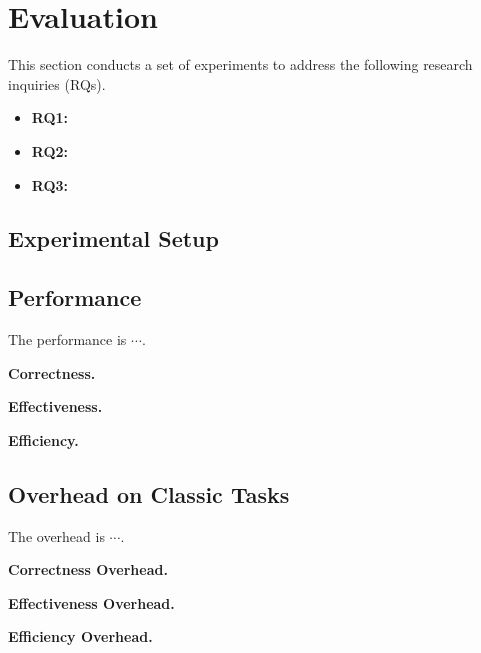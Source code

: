 \section{Evaluation}\label{sec:evaluation}

This section conducts a set of experiments
to address the following research inquiries (RQs).

\begin{itemize}
    \item \textbf{RQ1:}
    \item \textbf{RQ2:}
    \item \textbf{RQ3:}
\end{itemize}

\subsection{Experimental Setup}\label{subsec:experimental-setup}

\subsection{Performance}\label{subsec:performance}

The performance is $\cdots$.

\vspace{.4em}
\noindent
\textbf{Correctness.}

\vspace{.4em}
\noindent
\textbf{Effectiveness.}

\vspace{.4em}
\noindent
\textbf{Efficiency.}

\subsection{Overhead on Classic Tasks}\label{subsec:overhead}

The overhead is $\cdots$.

\vspace{.4em}
\noindent
\textbf{Correctness Overhead.}

\vspace{.4em}
\noindent
\textbf{Effectiveness Overhead.}

\vspace{.4em}
\noindent
\textbf{Efficiency Overhead.}
